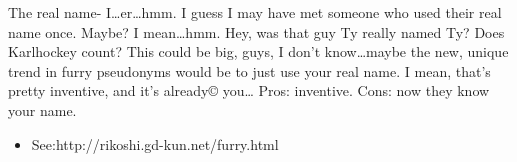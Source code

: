 The real name- I\ldots{}er\ldots{}hmm. I guess I may have met someone who used their real name once. Maybe? I mean\ldots{}hmm. Hey, was that guy Ty really named Ty? Does Karlhockey count? This could be big, guys, I don't know\ldots{}maybe the new, unique trend in furry pseudonyms would be to just use your real name. I mean, that's pretty inventive, and it's already© you\ldots{} Pros: inventive. Cons: now they know your name.

\begin{itemize}
\tightlist
\item
  See:http://rikoshi.gd-kun.net/furry.html
\end{itemize}
